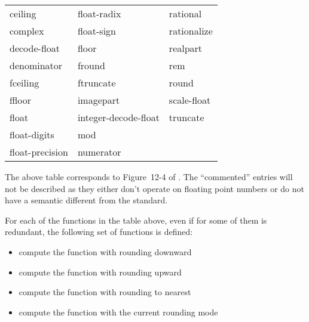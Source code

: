 \documentclass[../../Operations.tex]{subfiles}
\begin{document}
\label{sect:transc-ops}

\begin{tt}
  \begin{tabular}{lll}
    ceiling & float-radix & rational\\
    complex &  float-sign &  rationalize\\
    decode-float & floor  &  realpart\\
    denominator &  fround &  rem\\
    fceiling & ftruncate &  round\\
    ffloor &  imagepart &   scale-float\\
    float & integer-decode-float & truncate\\
    float-digits & mod & \\
    float-precision & numerator & \\
  \end{tabular}
\end{tt}

\vspace*{3mm}

\noindent
The above table corresponds to Figure~12-4 of \cite{1996:ANSIHyperSpec}.
The ``commented'' entries will not be described as they either don't
operate on floating point numbers or do not have a semantic different
from the \CL{} standard.

\noindent
For each of the functions in the table above, even if for some of them is
redundant, the following set of functions is defined:
\begin{itemize}
\item {} compute the function with rounding downward
\item {} compute the function with rounding upward
\item {} compute the function with rounding to nearest
\item {} compute the function with the current rounding mode
\end{itemize}
\vspace*{3mm}


\end{document}
